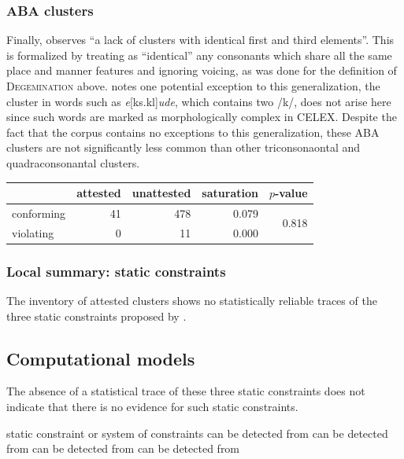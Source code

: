 \subsubsection{ABA clusters}

Finally, \citet[][176]{Pierrehumbert1994} observes ``a lack of clusters with identical first and third elements''. This is formalized by treating as ``identical'' any consonants which share all the same place and manner features and ignoring voicing, as was done for the definition of \textsc{Degemination} above. \citeauthor{Pierrehumbert1994} notes one potential exception to this generalization, the cluster in words such as \emph{e}[ks.kl]\emph{ude}, which contains two /k/, does not arise here since such words are marked as morphologically complex in CELEX. Despite the fact that the corpus contains no exceptions to this generalization, these \textsc{ABA} clusters are not significantly less common than other triconsonaontal and quadraconsonantal clusters.

\begin{example}
\begin{tabular}{l r r r r}
\toprule
           & attested & unattested & saturation & $p$-value \\
\midrule
conforming & 41       & 478        & 0.079      & \multirow{2}{*}{0.818} \\
violating  &  0       &  11        & 0.000                               \\
\bottomrule
\end{tabular}
\end{example}

\subsubsection{Local summary: static constraints}

The inventory of attested clusters shows no statistically reliable traces of the three static constraints proposed by \citet{Pierrehumbert1994}.

\subsection{Computational models}

The absence of a statistical trace of these three static constraints does not indicate that there is no evidence for such static constraints. 

static constraint or system of constraints can be detected from can be detected from can be detected from can be detected from 

